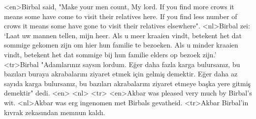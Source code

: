 <en>Birbal said, "Make your men count, My lord. If you find more crows it means some have come to visit their relatives here. If you find less number of crows it means some have gone to visit their relatives elsewhere". 
<nl>Birbal zei: `Laat uw mannen tellen, mijn heer. Als u meer kraaien vindt, betekent het dat sommige gekomen zijn om hier  hun familie te bezoeken. Als u minder kraaien vindt, betekent het dat sommige bij hun familie elders op bezoek zijn.'
<tr>Birbal "Adamlarınız saysın lordum. Eğer daha fazla karga bulursanız, bu bazıları buraya akrabalarını ziyaret etmek için gelmiş demektir. Eğer daha az sayıda karga bulursanız, bu bazıları akrabalarını ziyaret etmeye başka yere gitmiş demektir" dedi.
<en>
<nl>
<tr>
<en>Akbar was pleased very much by Birbal's wit. 
<nl>Akbar was erg ingenomen met Birbals gevatheid.
<tr>Akbar Birbal'in kıvrak zekasından memnun kaldı.
